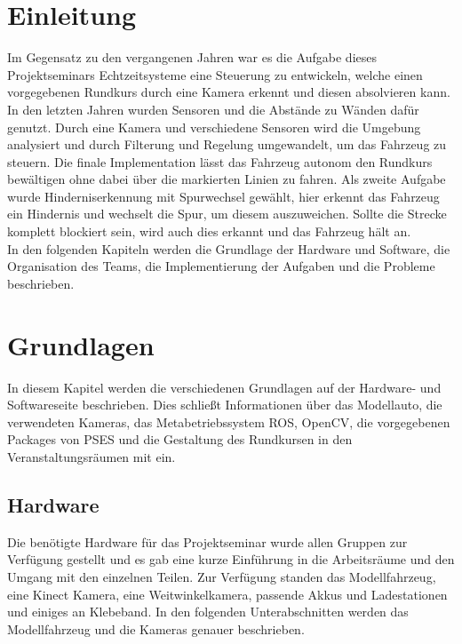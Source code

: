 \section{Einleitung}
\label{cha:einleitung}
Im Gegensatz zu den vergangenen Jahren war es die Aufgabe dieses Projektseminars Echtzeitsysteme eine Steuerung zu entwickeln, welche einen vorgegebenen Rundkurs durch eine Kamera erkennt und diesen absolvieren kann. In den letzten Jahren wurden Sensoren und die Abstände zu Wänden dafür genutzt. Durch eine Kamera und verschiedene Sensoren wird die Umgebung analysiert und durch Filterung und Regelung umgewandelt, um das Fahrzeug zu steuern. 
Die finale Implementation lässt das Fahrzeug autonom den Rundkurs bewältigen ohne dabei über die markierten Linien zu fahren. Als zweite Aufgabe wurde Hinderniserkennung mit Spurwechsel gewählt, hier erkennt das Fahrzeug ein Hindernis und wechselt die Spur, um diesem auszuweichen. Sollte die Strecke komplett blockiert sein, wird auch dies erkannt und das Fahrzeug hält an. \\
In den folgenden Kapiteln werden die Grundlage der Hardware und Software, die Organisation des Teams, die Implementierung der Aufgaben und die Probleme beschrieben.

\clearpage
\section{Grundlagen}
\label{cha:grundlagen}
In diesem Kapitel werden die verschiedenen Grundlagen auf der Hardware- und Softwareseite beschrieben. Dies schließt Informationen über das Modellauto, die verwendeten Kameras, das Metabetriebssystem ROS, OpenCV, die vorgegebenen Packages von PSES und die Gestaltung des Rundkursen in den Veranstaltungsräumen mit ein.

\subsection{Hardware}
\label{sec:hardware}
Die benötigte Hardware für das Projektseminar wurde allen Gruppen zur Verfügung gestellt und es gab eine kurze Einführung in die Arbeitsräume und den Umgang mit den einzelnen Teilen. Zur Verfügung standen das Modellfahrzeug, eine Kinect Kamera, eine Weitwinkelkamera, passende Akkus und Ladestationen und einiges an Klebeband. In den folgenden Unterabschnitten werden das Modellfahrzeug und die Kameras genauer beschrieben. 

